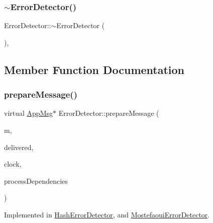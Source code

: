 \subsubsection{\texorpdfstring{$\sim$\+Error\+Detector()}{~ErrorDetector()}}
{\footnotesize\ttfamily Error\+Detector\+::$\sim$\+Error\+Detector (\begin{DoxyParamCaption}{ }\end{DoxyParamCaption})\hspace{0.3cm}{\ttfamily [pure virtual]}, {\ttfamily [default]}}



\subsection{Member Function Documentation}
\mbox{\label{class_error_detector_a8cac1f6ac6803da4379df7891789c490}} 
\subsubsection{\texorpdfstring{prepare\+Message()}{prepareMessage()}}
{\footnotesize\ttfamily virtual \hyperlink{class_app_msg}{App\+Msg}$\ast$ Error\+Detector\+::prepare\+Message (\begin{DoxyParamCaption}\item[{\hyperlink{class_app_msg}{App\+Msg} $\ast$}]{m,  }\item[{const vector$<$ \hyperlink{structures_8h_a7e7bdc1d2fff8a9436f2f352b2711ed6}{message\+Info} $>$ \&}]{delivered,  }\item[{const \hyperlink{class_probabilistic_clock}{Probabilistic\+Clock} \&}]{clock,  }\item[{const \hyperlink{class_total_dependencies}{Total\+Dependencies} \&}]{process\+Dependencies }\end{DoxyParamCaption})\hspace{0.3cm}{\ttfamily [pure virtual]}}



Implemented in \hyperlink{class_hash_error_detector_a2b1dad6a83a08fd7ce88e32f84638459}{Hash\+Error\+Detector}, and \hyperlink{class_mostefaoui_error_detector_adcd530d7349df19adb614ca414225214}{Mostefaoui\+Error\+Detector}.

\mbox{\label{class_error_detector_afc717d04768dd207196c08e24163115c}} 
